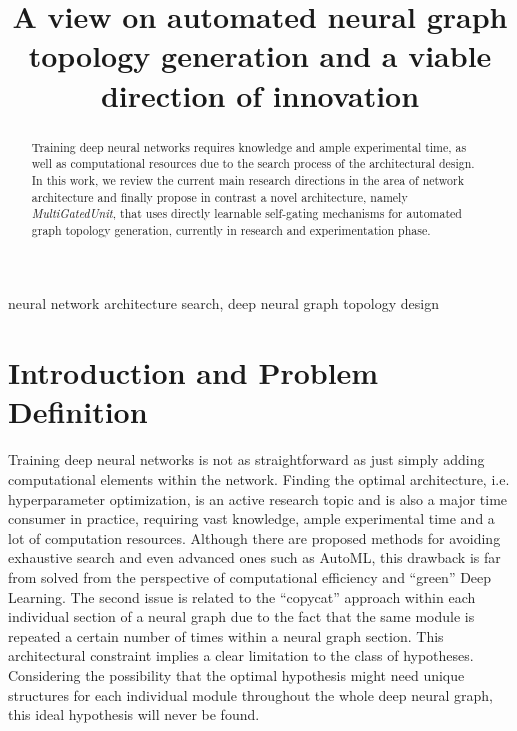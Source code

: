 \documentclass[conference]{IEEEtran}
\begin{document}
\title{ A view on automated neural graph topology generation and a viable direction of innovation\\
}

\author{
\and
{}
\and
{}
}

\maketitle

\begin{abstract}
Training deep neural networks requires knowledge and ample experimental time, as well as computational resources due to the search process of the architectural design. In this work, we review the current main research directions in the area of network architecture and finally propose in contrast a novel architecture, namely \textit{MultiGatedUnit}, that uses directly learnable self-gating mechanisms for automated graph topology generation, currently in research and experimentation phase.
\end{abstract}

\begin{IEEEkeywords}
neural network architecture search, deep neural graph topology design
\end{IEEEkeywords}

\section{Introduction and Problem Definition}

Training deep neural networks is not as straightforward as just simply adding computational elements within the network. Finding the optimal architecture, i.e. hyperparameter optimization, is an active research topic and is also a major time consumer in practice, requiring vast knowledge, ample experimental time and a lot of computation resources.  Although there are proposed methods for avoiding exhaustive search and even advanced ones such as AutoML, this drawback is far from solved from the perspective of computational efficiency and “green” Deep Learning. The second issue is related to the “copycat” approach within each individual section of a neural graph due to the fact that the same module is repeated a certain number of times within a neural graph section. This architectural constraint implies a clear limitation to the class of hypotheses. Considering the possibility that the optimal hypothesis might need unique structures for each individual module throughout the whole deep neural graph, this ideal hypothesis will never be found.
\end{document}
